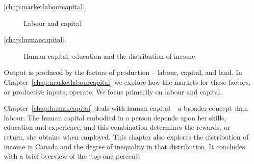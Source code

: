 
{\large\color{parttextcolour}
\begin{description}
\item[\textmd{\ref{chap:marketlabourcapital}.}] Labour and capital

\item[\textmd{\ref{chap:humancapital}.}] Human capital, education and the distribution of income
\end{description}
}

\vspace{1cm}

Output is produced by the factors of production -- labour, capital, and land. In Chapter~\ref{chap:marketlabourcapital} we explore how the markets for these factors, or productive inputs, operate. We focus primarily on labour and capital.

Chapter~\ref{chap:humancapital} deals with human capital -- a broader concept than labour. The human capital embodied in a person depends upon her skills, education and experience, and this combination determines the rewards, or return, she obtains when employed. This chapter also explores the distribution of income in Canada and the degree of inequality in that distribution. It concludes with a brief overview of the `top one percent'.
